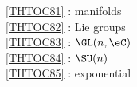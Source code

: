 \ref {THTOC81} : manifolds\\
\ref {THTOC82} : Lie groups\\
\ref {THTOC83} : \( \GL (n,\eC )\)\\
\ref {THTOC84} : \( \SU (n)\)\\
\ref {THTOC85} : exponential\\
